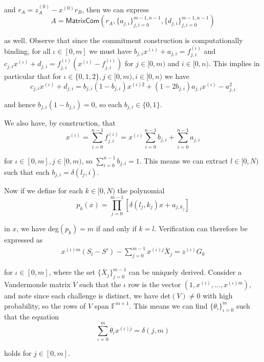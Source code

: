 \begin{appendices}
and $r_A = z^{(0)}_A - x^{(0)} r_B$, then we can express\vspace{.115cm}
\[ A = \mathsf{MatrixCom} \left( r_A, \{a_{j,i}\}^{m-1,n-1}_{j,i=0}, \{d_{j,i}\}^{m-1,n-1}_{j,i=0} \right) \]

as well. Observe that since the commitment construction is computationally binding, for all $\iota \in [0,m]$ we must have $b_{j,i} x^{(\iota)} + a_{j,i} = f^{(\iota)}_{j,i}$ and $c_{j,i} x^{(\iota)} + d_{j,i} = f^{(\iota)}_{j,i}(x^{(\iota)} - f^{(\iota)}_{j,i})$ for $j \in [0,m)$ and $i \in [0,n)$. This implies in particular that for $\iota \in \{0,1,2\}, j \in [0,m), i \in [0,n)$ we have\vspace{.115cm}
\[ c_{j,i} x^{(\iota)} + d_{j,i} = b_{j,i}(1 - b_{j,i})x^{(\iota)2} + (1 - 2 b_{j,i}) a_{j,i} x^{(\iota)} - a^2_{j,i} \]

and hence $b_{j,i}(1 - b_{j,i}) = 0$, so each $b_{j,i} \in \{0,1\}$.

We also have, by construction, that\vspace{.115cm}
\[ x^{(\iota)} = \sum^{n-1}_{i=0} f^{(\iota)}_{j,i} = x^{(\iota)} \sum^{n-1}_{i=0} b_{j,i} + \sum^{n-1}_{i=0} a_{j,i} \]

for $\iota \in [0,m], j\in [0,m)$, so $\sum^{n-1}_{i=0} b_{j,i} = 1$. This means we can extract $l \in [0,N)$ such that each $b_{j,i} = \delta(l_j,i)$.

Now if we define for each $k \in [0,N)$ the polynomial\vspace{.115cm}
\[ p_k(x) = \prod^{m-1}_{j=0} \left[ \delta(l_j, k_j) x + a_{j, k_j} \right] \]

in $x$, we have deg$(p_k) = m$ if and only if $k = l$. Verification can therefore be expressed as\vspace{.115cm}
\begin{align*}
    x^{(\iota)m}(S_l - S') - \sum^{m-1}_{j=0} x^{(\iota)j} \overline{X}_j = z^{(\iota)} G_0
\end{align*}

for $\iota \in [0,m]$, where the set $\{\overline{X}_j\}^{m-1}_{j=0}$ can be uniquely derived. Consider a Vandermonde matrix $V$ such that the $\iota$ row is the vector $(1, x^{(\iota)}, ..., x^{(\iota)m})$, and note since each challenge is distinct, we have det$(V) \neq 0$ with high probability, so the rows of $V$ span $\mathbb{F}^{m+1}$. This means we can find $\{\theta_{\iota}\}^m_{\iota = 0}$ such that the equation
\[ \sum^{m}_{\iota=0} \theta_{\iota} x^{(\iota)j} = \delta(j,m) \]

holds for $j \in [0,m]$.


\end{appendices}
